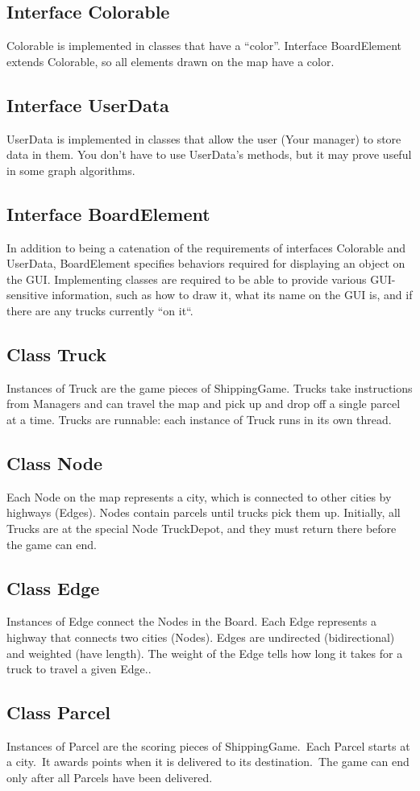 \documentclass[11pt]{article}
\begin{document}
\subsection{Interface Colorable}
Colorable  is implemented in classes that have a ``color''. Interface BoardElement extends Colorable, so  all elements drawn on the map have a color.
\subsection{Interface UserData}
UserData is implemented in classes that allow the user (Your manager) to store data in them. You don't have to use UserData's methods, but it may prove useful in some graph algorithms.
\subsection{Interface BoardElement}
In addition to being a catenation of the requirements of interfaces Colorable and UserData, BoardElement specifies behaviors required for displaying an object on the GUI. Implementing classes are required to be able to provide various GUI-sensitive information, such as how to draw it, what its name on the GUI is, and if there are any trucks currently ``on it``.
\subsection{Class Truck}
Instances of Truck are the game pieces of ShippingGame. Trucks take instructions from Managers and can travel the map and pick up and drop off a single parcel at a time. Trucks are runnable: each instance of Truck runs in its own thread.
\subsection{Class Node}
Each Node on the map represents a city, which is connected to other cities by highways (Edges). Nodes contain parcels until trucks pick them up. Initially, all Trucks are at the special Node TruckDepot, and they must return there before the game can end.
\subsection{Class Edge}
Instances of Edge connect the Nodes in the Board. Each Edge represents a highway that connects two cities (Nodes). Edges are undirected (bidirectional) and weighted (have length). The weight of the Edge tells how long it takes for a truck to travel a given Edge..
\subsection{Class Parcel}
Instances of Parcel are the scoring pieces of ShippingGame.\ Each Parcel starts at a city.\ It awards points when it is  delivered to its destination.\ The game can end only after all Parcels have been delivered.
\end{document}
